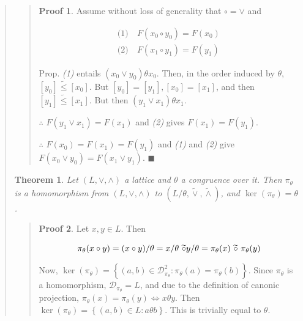 \documentclass[a4paper, 12pt]{article}
\newtheorem{theorem}{Theorem}
\theoremstyle{definition}
\theoremstyle{definition}
\theoremstyle{definition}
\newtheorem{pro}{Proof}
\DeclareMathOperator{\ker}{ker}
\begin{document}
\begin{quote}
\begin{quote}
\begin{pro}
Assume without loss of generality that $\circ = \lor$ and 

\begin{align*}
    \textit{(1)} ~ &F(x_0 \circ y_0) = F(x_0)\\
    \textit{(2)} ~ &F(x_1 \circ y_1) = F( y_1 )
\end{align*}

Prop. \textit{(1)} entails $(x_0 \lor y_0)\theta x_0$. Then, in the order
induced by $\theta$, $[y_0] \tilde{ \leq } [x_0]$. But $[y_0] = [y_1], [x_0] =
[x_1]$, and then $[y_1] \tilde{ \leq } [x_1]$. But then $(y_1 \lor x_1)\theta
x_1$. 

$\therefore $ $F(y_1 \lor  x_1) = F(x_1)$ and \textit{(2)} gives $F(x_1) = F(y_1)$.

$\therefore $ $F(x_0) = F(x_1) = F(y_1)$ and \textit{(1)} and \textit{(2)} give 
$F(x_0 \lor  y_0) = F(x_1 \lor  y_1)$. $\blacksquare$

\end{pro}

\end{quote}
\normalsize

\begin{theorem}
    Let $(L, \lor , \land )$ a lattice and $\theta$ a congruence over it. 
    Then $\pi_{\theta}$ is a homomorphism from $(L, \lor , \land )$ to 
    $(L / \theta, \widetilde{ \lor  }, \widetilde{ \land  } ) $, and 
    $\ker(\pi_{\theta}) = \theta$.
\end{theorem}


\small
\begin{quote}

    \begin{pro}
        
Let $x, y \in L$. Then 

\begin{equation*}
    \pi_{\theta}(x \circ  y) = (x \circ y) / \theta
                            = x / \theta ~ \widetilde{ \circ }  y / \theta\\ 
                            = \pi_{\theta}(x) ~ \widetilde{ \circ }  ~ \pi_{\theta}(y)
\end{equation*}

    Now, $\ker(\pi_\theta) = \left\{ (a, b) \in \mathcal{D}_{\pi_\theta}^2 :
        \pi_\theta(a)
    = \pi_\theta(b) \right\} $. Since $\pi_{\theta}$ is 
    a homomorphism, $\mathcal{D}_{\pi_\theta} = L$, and due 
    to the definition of canonic projection, 
    $\pi_\theta(x) = \pi_\theta(y) \iff x\theta y$.
    Then $\ker(\pi_\theta) = \left\{ (a, b) \in L : a\theta b \right\} $.
    This is trivially equal to $\theta$.
    \end{pro}



\end{quote}
\end{quote}
\end{document}
